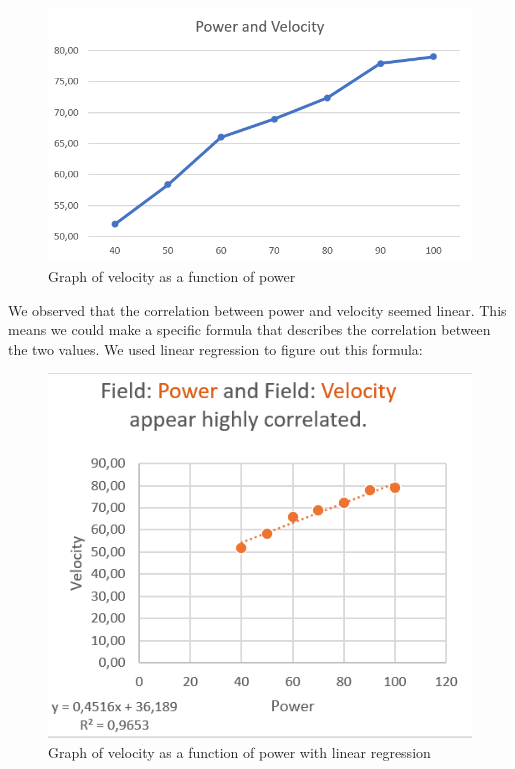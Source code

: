 \begin{figure}[h!]
		\centering
	\includegraphics[width=1\linewidth]{figures/velocity_and_power}
	\caption[Graph of velocity as function of power]{Graph of velocity as a function of power}
	\label{fig:graphvelpow}
\end{figure}

We observed that the correlation between power and velocity seemed linear. This means we could make a specific formula that describes the correlation between the two values. We used linear regression to figure out this formula:

\begin{figure}[h!]
	\centering
	\includegraphics[width=1\linewidth]{figures/function_of_power}
	\caption{Graph of velocity as a function of power with linear regression}
	\label{fig:functionofpower}
\end{figure}


